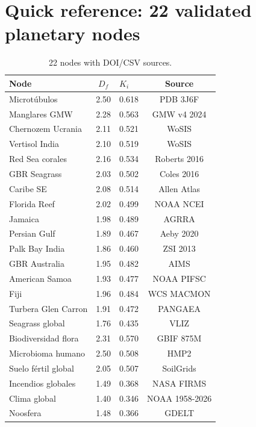 \documentclass[12pt, a4paper]{article}
\theoremstyle{miuThm}
\theoremstyle{remark}
\begin{document}
\section{Quick reference: 22 validated planetary nodes}
\label{app:nodos_planetarios}
\begin{table}[h!]
\centering
\caption{22 nodes with DOI/CSV sources.}
\label{tab:ref_rapida}
\begin{tabular}{lclc}
\toprule
\textbf{Node} & \textbf{$D_f$} & \textbf{$K_i$} & \textbf{Source} \\
\midrule
Microtúbulos & 2.50 & 0.618 & PDB 3J6F \\
Manglares GMW & 2.28 & 0.563 & GMW v4 2024 \\
Chernozem Ucrania & 2.11 & 0.521 & WoSIS \\
Vertisol India & 2.10 & 0.519 & WoSIS \\
Red Sea corales & 2.16 & 0.534 & Roberts 2016 \\
GBR Seagrass & 2.03 & 0.502 & Coles 2016 \\
Caribe SE & 2.08 & 0.514 & Allen Atlas \\
Florida Reef & 2.02 & 0.499 & NOAA NCEI \\
Jamaica & 1.98 & 0.489 & AGRRA \\
Persian Gulf & 1.89 & 0.467 & Aeby 2020 \\
Palk Bay India & 1.86 & 0.460 & ZSI 2013 \\
GBR Australia & 1.95 & 0.482 & AIMS \\
American Samoa & 1.93 & 0.477 & NOAA PIFSC \\
Fiji & 1.96 & 0.484 & WCS MACMON \\
Turbera Glen Carron & 1.91 & 0.472 & PANGAEA \\
Seagrass global & 1.76 & 0.435 & VLIZ \\
Biodiversidad flora & 2.31 & 0.570 & GBIF 875M \\
Microbioma humano & 2.50 & 0.508 & HMP2 \\
Suelo fértil global & 2.05 & 0.507 & SoilGrids \\
Incendios globales & 1.49 & 0.368 & NASA FIRMS \\
Clima global & 1.40 & 0.346 & NOAA 1958-2026 \\
Noosfera & 1.48 & 0.366 & GDELT \\
\bottomrule
\end{tabular}
\end{table}
\end{document}

